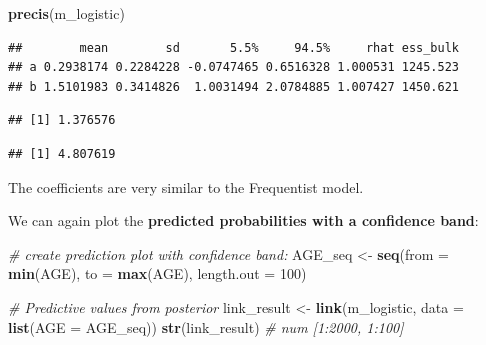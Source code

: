\documentclass[
]{book}
\newenvironment{Shaded}{\begin{snugshade}}{\end{snugshade}}
\newcommand{\AttributeTok}[1]{\textcolor[rgb]{0.13,0.29,0.53}{#1}}
\newcommand{\CommentTok}[1]{\textcolor[rgb]{0.56,0.35,0.01}{\textit{#1}}}
\newcommand{\DecValTok}[1]{\textcolor[rgb]{0.00,0.00,0.81}{#1}}
\newcommand{\FunctionTok}[1]{\textcolor[rgb]{0.13,0.29,0.53}{\textbf{#1}}}
\newcommand{\NormalTok}[1]{#1}
\newcommand{\OtherTok}[1]{\textcolor[rgb]{0.56,0.35,0.01}{#1}}
\newcommand{\SpecialCharTok}[1]{\textcolor[rgb]{0.81,0.36,0.00}{\textbf{#1}}}
\begin{document}
\begin{Shaded}
\begin{Highlighting}[]
\FunctionTok{precis}\NormalTok{(m\_logistic)}
\end{Highlighting}
\end{Shaded}

\begin{verbatim}
##        mean        sd       5.5%     94.5%     rhat ess_bulk
## a 0.2938174 0.2284228 -0.0747465 0.6516328 1.000531 1245.523
## b 1.5101983 0.3414826  1.0031494 2.0784885 1.007427 1450.621
\end{verbatim}

\begin{Shaded}
\end{Shaded}

\begin{verbatim}
## [1] 1.376576
\end{verbatim}

\begin{Shaded}
\end{Shaded}

\begin{verbatim}
## [1] 4.807619
\end{verbatim}

The coefficients are very similar to the Frequentist model.

We can again plot the \textbf{predicted probabilities with a confidence band}:

\begin{Shaded}
\begin{Highlighting}[]
\CommentTok{\# create prediction plot with confidence band:}
\NormalTok{AGE\_seq }\OtherTok{\textless{}{-}} \FunctionTok{seq}\NormalTok{(}\AttributeTok{from =} \FunctionTok{min}\NormalTok{(AGE), }\AttributeTok{to =} \FunctionTok{max}\NormalTok{(AGE), }\AttributeTok{length.out =} \DecValTok{100}\NormalTok{)}

\CommentTok{\# Predictive values from posterior}
\NormalTok{link\_result }\OtherTok{\textless{}{-}} \FunctionTok{link}\NormalTok{(m\_logistic, }\AttributeTok{data =} \FunctionTok{list}\NormalTok{(}\AttributeTok{AGE =}\NormalTok{ AGE\_seq))}
\FunctionTok{str}\NormalTok{(link\_result) }\CommentTok{\# num [1:2000, 1:100]}
\end{Highlighting}
\end{Shaded}
\end{document}
